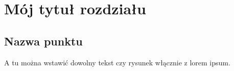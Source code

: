 \chapter{Mój tytuł rozdziału}
\section{Nazwa punktu}

A tu można wstawić dowolny tekst czy rysunek włącznie z lorem ipsum.